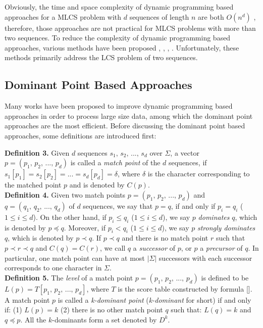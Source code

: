 \documentclass{article}
\begin{document}
Obviously, the time and space complexity of dynamic programming based
approaches for a MLCS problem with $d$ sequences of length $n$ are
both $O(n^d)$ \cite{Hsu1984}, therefore, those approaches are not
practical for MLCS problems with more than two sequences. To reduce
the complexity of dynamic programming based approaches, various
methods have been proposed \cite{Hirschberg1977},
\cite{Apostolico1992}, \cite{Masek1980},
\cite{Rick1994}. Unfortunately, these methods primarily address the
LCS problem of two sequences.

\subsection{Dominant Point Based Approaches}
\label{sec:Dominant Point}

Many works have been proposed to improve dynamic programming based
approaches in order to process large size data, among which the
dominant point approaches are the most efficient. Before discussing
the dominant point based approaches, some definitions are introduced
first:

\textbf{Definition 3.} Given $d$ sequences $s_1,\, s_2,\, ...,\, s_d$
over $\Sigma$, a vector $p = (p_1,\, p_2,\, ...,\, p_d)$ is called a
\emph{match point} of the $d$ sequences, if
$s_1[p_1] = s_2[p_2] = ... = s_d[p_d] = \delta$, where $\delta$ is the
character corresponding to
the matched point $p$ and is denoted by $C(p)$.\\

\textbf{Definition 4.} Given two match points
$p = (p_1,\, p_2,\, ...,\, p_d)$ and $q = (q_1,\, q_2,\, ...,\, q_d)$
of $d$ sequences, we say that $p = q$, if and only if $p_i = q_i$
($1 \leq i \leq d$). On the other hand, if $p_i \leq q_i$
($1 \leq i \leq d$), we say $p$ \emph{dominates} $q$, which is denoted
by $p \preceq q$. Moreover, if $p_i < q_i$ ($1 \leq i \leq d$), we say
$p$ \emph{strongly dominates} $q$, which is denoted by $p \prec q$.
If $p \prec q$ and there is no match point $r$ such that
$p \prec r \prec q$ and $C(q) = C(r)$, we call $q$ a \emph{successor}
of $p$, or $p$ a \emph{precursor} of $q$. In particular, one match
point can have at most $|\Sigma|$ successors with each successor
corresponds to one character in
$\Sigma$. \\

\textbf{Definition 5.} The \emph{level} of a match point
$p = (p_1,\, p_2,\, ...,\, p_d)$ is defined to be
$L(p) = T[p_1,\, p_2,\, ...,\, p_d]$, where $T$ is the score table
constructed by formula []. A match point $p$ is called a
\emph{k-dominant point} (\emph{k-dominant} for short) if and only if:
(1) $L(p) = k$ (2) there is no other match point $q$ such that:
$L(q) = k$ and $q \preceq p$. All the $k$-dominants form a set denoted
by $D^k$.
\end{document}

